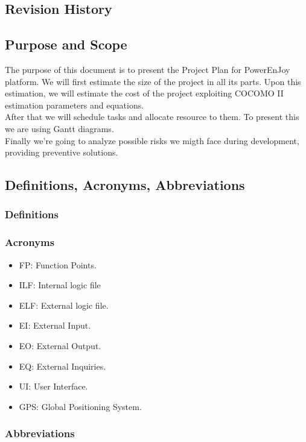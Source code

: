\subsection{Revision History}
\subsection{Purpose and Scope}
The purpose of this document is to present the Project Plan for PowerEnJoy platform. We will first estimate the size of the project in all its parts. Upon this estimation, we will estimate the cost of the project exploiting COCOMO II estimation parameters and equations.\\
After that we will schedule tasks and allocate resource to them. To present this we are using Gantt diagrams.\\
Finally we're going to analyze possible risks we migth face during development, providing preventive solutions.
\subsection{Definitions, Acronyms, Abbreviations}
\subsubsection{Definitions}
\subsubsection{Acronyms}
\begin{itemize}
	\item FP: Function Points.
	\item ILF: Internal logic file
	\item ELF: External logic file.
	\item EI: External Input.
	\item EO: External Output.
	\item EQ: External Inquiries.
	\item UI: User Interface.
	\item GPS: Global Positioning System.
\end{itemize}
\subsubsection{Abbreviations}
